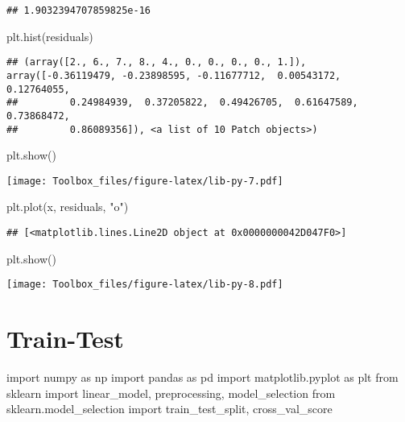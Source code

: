 \documentclass[
]{book}
\newenvironment{Shaded}{\begin{snugshade}}{\end{snugshade}}
\newcommand{\ImportTok}[1]{#1}
\newcommand{\NormalTok}[1]{#1}
\newcommand{\StringTok}[1]{\textcolor[rgb]{0.31,0.60,0.02}{#1}}
\begin{document}
\begin{verbatim}
## 1.9032394707859825e-16
\end{verbatim}

\begin{Shaded}
\begin{Highlighting}[]
\NormalTok{plt.hist(residuals)}
\end{Highlighting}
\end{Shaded}

\begin{verbatim}
## (array([2., 6., 7., 8., 4., 0., 0., 0., 0., 1.]), array([-0.36119479, -0.23898595, -0.11677712,  0.00543172,  0.12764055,
##         0.24984939,  0.37205822,  0.49426705,  0.61647589,  0.73868472,
##         0.86089356]), <a list of 10 Patch objects>)
\end{verbatim}

\begin{Shaded}
\begin{Highlighting}[]
\NormalTok{plt.show()}
\end{Highlighting}
\end{Shaded}

\texttt{[image: Toolbox\_files/figure-latex/lib-py-7.pdf]}

\begin{Shaded}
\begin{Highlighting}[]
\NormalTok{plt.plot(x, residuals, }\StringTok{"o"}\NormalTok{)}
\end{Highlighting}
\end{Shaded}

\begin{verbatim}
## [<matplotlib.lines.Line2D object at 0x0000000042D047F0>]
\end{verbatim}

\begin{Shaded}
\begin{Highlighting}[]
\NormalTok{plt.show()}
\end{Highlighting}
\end{Shaded}

\texttt{[image: Toolbox\_files/figure-latex/lib-py-8.pdf]}

\hypertarget{train-test}{%
\section{Train-Test}\label{train-test}}

\begin{Shaded}
\begin{Highlighting}[]
\ImportTok{import}\NormalTok{ numpy }\ImportTok{as}\NormalTok{ np}
\ImportTok{import}\NormalTok{ pandas }\ImportTok{as}\NormalTok{ pd}
\ImportTok{import}\NormalTok{ matplotlib.pyplot }\ImportTok{as}\NormalTok{ plt}
\ImportTok{from}\NormalTok{ sklearn }\ImportTok{import}\NormalTok{ linear\_model, preprocessing, model\_selection}
\ImportTok{from}\NormalTok{ sklearn.model\_selection }\ImportTok{import}\NormalTok{ train\_test\_split, cross\_val\_score}
\end{Highlighting}
\end{Shaded}
\end{document}
